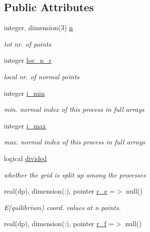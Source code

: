\subsection*{Public Attributes}
\begin{DoxyCompactItemize}
\item 
integer, dimension(3) \hyperlink{structgrid__vars_1_1grid__type_a6c7d0e3483a15c2c8019fc3c00504686}{n}
\begin{DoxyCompactList}\small\item\em tot nr. of points \end{DoxyCompactList}\item 
integer \hyperlink{structgrid__vars_1_1grid__type_abb914b054e63edb4e56329b578031b0c}{loc\+\_\+n\+\_\+r}
\begin{DoxyCompactList}\small\item\em local nr. of normal points \end{DoxyCompactList}\item 
integer \hyperlink{structgrid__vars_1_1grid__type_adb8e8ac883ac155accedc570de003465}{i\+\_\+min}
\begin{DoxyCompactList}\small\item\em min. normal index of this process in full arrays \end{DoxyCompactList}\item 
integer \hyperlink{structgrid__vars_1_1grid__type_aabfcadb3adae8b408a18569f6cddf663}{i\+\_\+max}
\begin{DoxyCompactList}\small\item\em max. normal index of this process in full arrays \end{DoxyCompactList}\item 
logical \hyperlink{structgrid__vars_1_1grid__type_ac4e6680c60d5a7ef4b776e5df5410f8a}{divided}
\begin{DoxyCompactList}\small\item\em whether the grid is split up among the processes \end{DoxyCompactList}\item 
real(dp), dimension(\+:), pointer \hyperlink{structgrid__vars_1_1grid__type_aeb2850b6e1157f7935270a02d77f688d}{r\+\_\+e} =$>$ null()
\begin{DoxyCompactList}\small\item\em E(quilibrium) coord. values at n points. \end{DoxyCompactList}\item 
real(dp), dimension(\+:), pointer \hyperlink{structgrid__vars_1_1grid__type_a070b58cf0d5f41f3b99f2e3fabd2fdd4}{r\+\_\+f} =$>$ null()

\end{DoxyCompactItemize}
